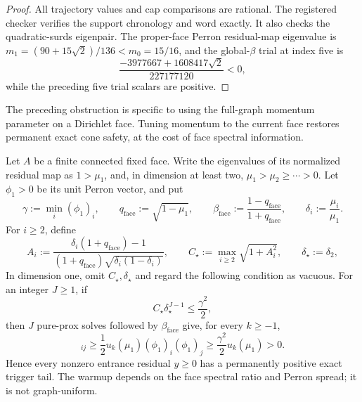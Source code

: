 \documentclass[11pt]{article}
\begin{document}
\begin{proof}
All trajectory values and cap comparisons are rational.  The registered
checker verifies the support chronology and word exactly.  It also checks the
quadratic-surds eigenpair.  The proper-face Perron residual-map eigenvalue is
$m_1=(90+15\sqrt2)/136<m_0=15/16$, and the global-$\beta$ trial at index five
is
\begin{equation*}
 \frac{-3977667+1608417\sqrt2}{227177120}<0,
\end{equation*}
while the preceding five trial scalars are positive.
\end{proof}

The preceding obstruction is specific to using the full-graph momentum
parameter on a Dirichlet face.  Tuning momentum to the current face restores
permanent exact cone safety, at the cost of face spectral information.

\begin{theorem}
\label{thm:face-tuned-permanent-safety}
Let $A$ be a finite connected fixed face.  Write the eigenvalues of its
normalized residual map as $1>\mu_1$, and, in dimension at least two,
$\mu_1>\mu_2\geq\cdots>0$.  Let $\phi_1>0$ be its unit Perron vector, and put
\begin{equation*}
 \gamma:=\min_i(\phi_1)_i,\qquad
 q_{\mathrm{face}}:=\sqrt{1-\mu_1},\qquad
 \beta_{\mathrm{face}}:=\frac{1-q_{\mathrm{face}}}{1+q_{\mathrm{face}}},\qquad
 \delta_i:=\frac{\mu_i}{\mu_1}.
\end{equation*}
For $i\geq2$, define
\begin{equation*}
 A_i:=\frac{\delta_i(1+q_{\mathrm{face}})-1}
 {(1+q_{\mathrm{face}})\sqrt{\delta_i(1-\delta_i)}},\qquad
 C_\star:=\max_{i\geq2}\sqrt{1+A_i^2},\qquad
 \delta_\star:=\delta_2,
\end{equation*}
In dimension one, omit $C_\star,\delta_\star$ and regard the following
condition as vacuous.  For an integer $J\geq1$, if
\begin{equation}
 C_\star\delta_\star^{J-1}\leq\frac{\gamma^2}{2},
 \label{eq:face-tuned-warmup-condition}
\end{equation}
then $J$ pure-prox solves followed by $\beta_{\mathrm{face}}$ give, for every
$k\geq-1$,
\begin{equation}
 [u_k(\overline{\mathcal M}_A)]_{ij}
 \geq\frac12u_k(\mu_1)(\phi_1)_i(\phi_1)_j
 \geq\frac{\gamma^2}{2}u_k(\mu_1)>0.
 \label{eq:face-tuned-kernel-margin}
\end{equation}
Hence every nonzero entrance residual $y\geq0$ has a permanently positive
exact trigger tail.  The warmup depends on the face spectral ratio and Perron
spread; it is not graph-uniform.
\end{theorem}
\end{document}
